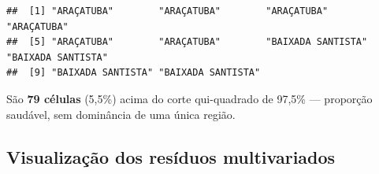 \documentclass[
  11pt,
]{article}
\newenvironment{Shaded}{\begin{snugshade}}{\end{snugshade}}
\newcommand{\NormalTok}[1]{#1}
\newcommand{\OtherTok}[1]{\textcolor[rgb]{0.56,0.35,0.01}{#1}}
\newcommand{\SpecialCharTok}[1]{\textcolor[rgb]{0.81,0.36,0.00}{\textbf{#1}}}
\begin{document}
\begin{verbatim}
##  [1] "ARAÇATUBA"        "ARAÇATUBA"        "ARAÇATUBA"        "ARAÇATUBA"       
##  [5] "ARAÇATUBA"        "ARAÇATUBA"        "BAIXADA SANTISTA" "BAIXADA SANTISTA"
##  [9] "BAIXADA SANTISTA" "BAIXADA SANTISTA"
\end{verbatim}

São \textbf{79 células} (5,5\%) acima do corte qui-quadrado de 97,5\%
--- proporção saudável, sem dominância de uma única região.

\subsection{Visualização dos resíduos
multivariados}\label{visualizauxe7uxe3o-dos-resuxedduos-multivariados}

\begin{Shaded}
\end{Shaded}
\end{document}
